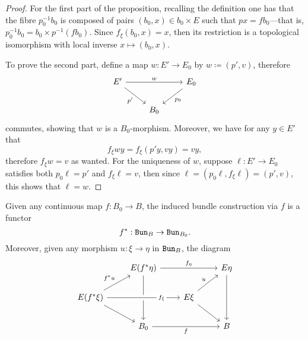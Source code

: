 \documentclass[../../../deep-dive]{subfile}
\begin{document}
\begin{proof}
    For the first part of the proposition, recalling the definition one has that the
    fibre \(p_0^{-1} b_0\) is composed of pairs \((b_0, x) \in b_0 \times E\) such
    that \(p x = f b_0\)---that is, \(p_0^{-1} b_0 = b_0 \times p^{-1} (f
    b_0)\). Since \(f_{\xi}(b_0, x) = x\), then its restriction is a topological
    isomorphism with local inverse \(x \mapsto (b_0, x)\).

    To prove the second part, define a map \(w: E' \to E_0\) by
    \(w \coloneq (p', v)\), therefore
    \[
        \begin{tikzcd}
            E' \ar[rr, "w"] \ar[rd, "p'"'] & &E_0 \ar[dl, "p_0"]  \\
            &B_0 &
        \end{tikzcd}
    \]
    commutes, showing that \(w\) is a \(B_0\)-morphism. Moreover, we have for any
    \(y \in E'\) that
    \[
        f_{\xi} w y = f_{\xi}(p' y, v y) = v y,
    \]
    therefore \(f_{\xi} w = v\) as wanted. For the uniqueness of \(w\), suppose
    \(\ell: E' \to E_0\) satisfies both \(p_0 \ell = p'\) and \(f_{\xi} \ell = v\),
    then since \(\ell = (p_0 \ell, f_{\xi} \ell) = (p', v)\), this shows that
    \(\ell = w\).
\end{proof}

\begin{proposition}
    \label{prop:induced-bundle-is-functorial}
    Given any continuous map \(f: B_0 \to B\), the induced bundle construction via
    \(f\) is a functor
    \[
        f^{*}: {\texttt{Bun}}_B \to {\texttt{Bun}}_{B_0}.
    \]
    Moreover, given any morphism \(u: \xi \to \eta\) in \({\texttt{Bun}}_B\), the diagram
    \[
        \begin{tikzcd}
            &E(f^{*} \eta)
            \ar[dd]
            \ar[rr, "f_{\eta}"]
            &
            & E \eta \ar[dd]
            \\
            E (f^{*} \xi)
            \ar[ur, "f^{*} u"]
            \ar[rd]
            \ar[rr, "f_{\xi}" description, crossing over, near end]
            &
            &E \xi \ar[ur, "u"] \ar[rd]
            &
            \\
            &B_0 \ar[rr, "f"']
            &
            &B
        \end{tikzcd}
    \]
\end{proposition}
\end{document}
